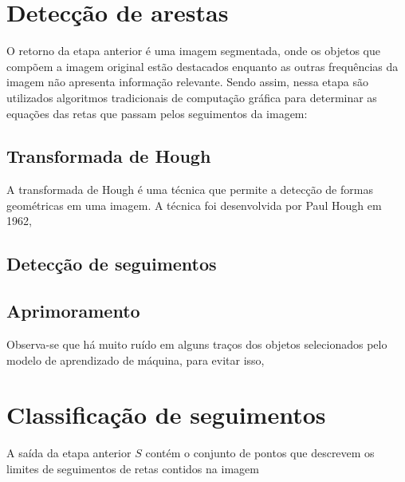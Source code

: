 \documentclass[12pt]{article}
\begin{document}
\section{Detecção de arestas}

O retorno da etapa anterior é uma imagem segmentada, onde os objetos que compõem a imagem original estão destacados enquanto as outras frequências da imagem não apresenta informação relevante. Sendo assim, nessa etapa são utilizados algoritmos tradicionais de computação gráfica
para determinar as equações das retas que passam pelos seguimentos da imagem:

\subsection{Transformada de Hough}

A transformada de Hough é uma técnica que permite a detecção de formas geométricas em uma imagem. A técnica foi desenvolvida por Paul Hough em 1962, 

\subsection{Detecção de seguimentos}


\subsection{Aprimoramento}

Observa-se que há muito ruído em alguns traços dos objetos selecionados pelo modelo de aprendizado de máquina, para evitar isso,  


\section{Classificação de seguimentos}

A saída da etapa anterior $S$ contém o conjunto de pontos que descrevem os limites de seguimentos de retas contidos na imagem




\end{document}
